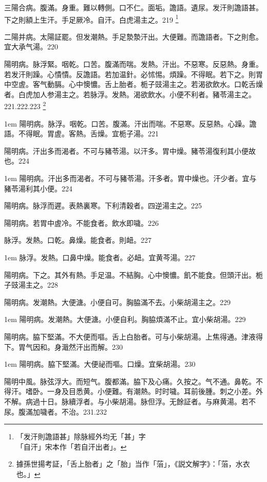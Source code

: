 三陽合病。腹滿。身重。難以轉側。口不仁。面垢。譫語。遺尿。发汗則譫語{\khaaitp 甚}。下之則額上生汗。手足厥冷。自汗。白虎湯主之。219
	\footnote{「发汗則譫語甚」除脉經外均无「甚」字\\「自汗」宋本作「若自汗出者」。}

二陽并病。太陽証罷。但发潮熱。手足漐漐汗出。大便難。而譫語者。下之則愈。宜{\khaaitp 大}承气湯。220

陽明病。脉浮緊。咽乾。口苦。腹滿而喘。发熱。汗出。不惡寒。反惡熱。身重。若发汗則躁。心憒憒。反譫語。若加温針。必怵惕。煩躁。不得眠。若下之。則胃中空虗。客气動膈。心中懊憹。舌上胎者。栀子{\khaaitp 豉}湯主之。若渴欲飲水。口乾舌燥者。白虎{\khaaitp 加人参}湯主之。若脉浮。发熱。渴欲飲水。小便不利者。豬苓湯主之。221.222.223
	\footnote{
		據孫世揚考証，「舌上胎者」之「胎」当作「菭」，《説文解字》：「菭，水衣也。」
	}

\hangindent 1em
陽明病。脉浮。咽乾。口苦。腹滿。汗出而喘。不惡寒。反惡熱。心躁。譫語。不得眠。胃虗。客熱。舌燥。宜栀子湯。{\gaoben}221

陽明病。汗出多而渴者。不可与豬苓湯。以汗多。胃中燥。豬苓湯復利其小便故也。224

\hangindent 1em
陽明病。汗出多而渴者。不可与豬苓湯。汗多者。胃中燥也。汗少者。宜与豬苓湯利其小便。{\gaoben}224

{\khaaitp 陽明病。}脉浮而遲。表熱裏寒。下利清穀者。四逆湯主之。225

{\khaaitp 陽明病。}若胃中虗冷。不能食者。飲水即噦。226

脉浮。发熱。口乾。鼻燥。能食者。則衄。227

\hangindent 1em
脉浮。发熱。口鼻中燥。能食者。必衄。宜黄芩湯。{\gaoben}227

陽明病。下之。其外有熱。手足温。不結胸。心中懊憹。飢不能食。但頭汗出。栀子{\khaaitp 豉}湯主之。228

陽明病。发潮熱。大便溏。小便自可。胸脇滿不去。小柴胡湯主之。229

\hangindent 1em
陽明病。发潮熱。大便溏。小便自利。胸脇煩滿不止。宜小柴胡湯。{\gaoben}229

陽明病。脇下堅滿。不大便而嘔。舌上白胎者。可与小柴胡湯。上焦得通。津液得下。胃气因和。身濈然汗出而解。230

\hangindent 1em
陽明病。脇下堅滿。大便祕而嘔。口燥。宜柴胡湯。{\gaoben}230

陽明中風。脉弦浮大。而短气。腹都滿。脇下及心痛。久按之。气不通。鼻乾。不得汗。嗜卧。一身及目悉黄。小便難。有潮熱。时时噦。耳前後腫。刺之小差。外不解。病過十日。脉續浮者。与{\khaaitp 小}柴胡湯。脉但浮。无餘証者。与麻黄湯。若不尿。腹滿加噦者。不治。231.232

